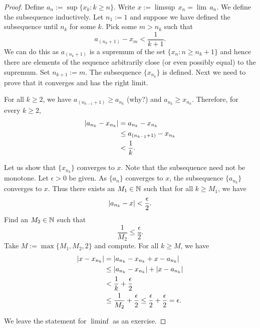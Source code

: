 \begin{proof}
Define $a_n := \sup \{ x_k : k \geq n \}$.
Write
$x := \limsup \, x_n = \lim\, a_n$.  We define the subsequence inductively.
Let $n_1 := 1$ and suppose we have
defined the subsequence until $n_k$ for some $k$.  Pick some $m > n_k$
such that
\begin{equation*}
a_{(n_k+1)} - x_m < \frac{1}{k+1} .
\end{equation*}
We can do this as $a_{(n_k+1)}$ is a supremum of the
set $\{ x_n : n \geq n_k + 1 \}$ and hence there are elements
of the sequence arbitrarily close (or even possibly equal) to the supremum.
Set $n_{k+1} :=  m$.  The subsequence $\{ x_{n_k} \}$ is defined.  Next we
need to prove that it converges and has the right limit.

For all $k \geq 2$, we have
$a_{(n_{k-1}+1)} \geq a_{n_k}$ (why?) and $a_{n_{k}} \geq x_{n_k}$.
Therefore, for every $k \geq 2$,
\begin{equation*}
\begin{split}
\left\lvert {a_{n_k} - x_{n_k}} \right\rvert & = 
a_{n_k} - x_{n_k}
\\
& \leq
a_{(n_{k-1}+1)} - x_{n_k}
\\
& < \frac{1}{k} .
\end{split}
\end{equation*}

Let us show that $\{ x_{n_k} \}$ converges to $x$.
Note that the subsequence need not be monotone.  Let $\epsilon > 0$ be given.
As $\{ a_n \}$ converges to $x$, the subsequence
$\{ a_{n_k} \}$ converges to $x$.
Thus there exists an $M_1 \in {\mathbb{N}}$
such that for all $k \geq M_1$, we have
\begin{equation*}
\left\lvert {a_{n_k} - x} \right\rvert < \frac{\epsilon}{2} .
\end{equation*}
Find an $M_2 \in {\mathbb{N}}$ such that
\begin{equation*}
\frac{1}{M_2} \leq \frac{\epsilon}{2}.
\end{equation*}
Take $M := \max \{M_1 , M_2 , 2 \}$ and compute.  For all $k \geq M$,
we have
\begin{equation*}
\begin{split}
\left\lvert {x- x_{n_k}} \right\rvert & =
\left\lvert {a_{n_k} - x_{n_k} + x - a_{n_k}} \right\rvert
\\
& \leq \left\lvert {a_{n_k} - x_{n_k}} \right\rvert + \left\lvert {x - a_{n_k}} \right\rvert
\\
& < \frac{1}{k} + \frac{\epsilon}{2}
\\
& \leq \frac{1}{M_2} + \frac{\epsilon}{2} \leq \frac{\epsilon}{2} +
\frac{\epsilon}{2} = \epsilon .
\end{split}
\end{equation*}

We leave the statement for $\liminf$ as an exercise.
\end{proof}

